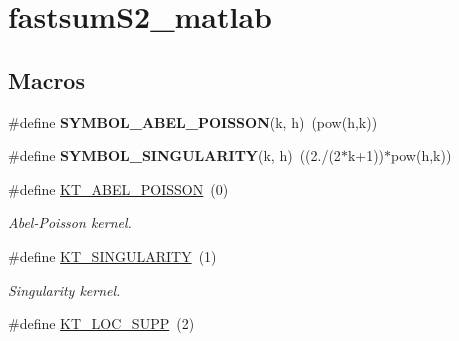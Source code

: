 \hypertarget{group__applications__fastsumS2__test}{\section{fastsum\-S2\-\_\-matlab}
\label{group__applications__fastsumS2__test}
}
\subsection*{Macros}
\begin{DoxyCompactItemize}
\item 
\hypertarget{group__applications__fastsumS2__test_ga0512f12a35b9bcac68ac0d36cd9b50d5}{\#define {\bfseries S\-Y\-M\-B\-O\-L\-\_\-\-A\-B\-E\-L\-\_\-\-P\-O\-I\-S\-S\-O\-N}(k, h)~(pow(h,k))}\label{group__applications__fastsumS2__test_ga0512f12a35b9bcac68ac0d36cd9b50d5}

\item 
\hypertarget{group__applications__fastsumS2__test_ga580e1a9e3fba99e0750908b58010dc00}{\#define {\bfseries S\-Y\-M\-B\-O\-L\-\_\-\-S\-I\-N\-G\-U\-L\-A\-R\-I\-T\-Y}(k, h)~((2./(2$\ast$k+1))$\ast$pow(h,k))}\label{group__applications__fastsumS2__test_ga580e1a9e3fba99e0750908b58010dc00}

\item 
\hypertarget{group__applications__fastsumS2__test_ga0452118afd292fc346ed8116915d001e}{\#define \hyperlink{group__applications__fastsumS2__test_ga0452118afd292fc346ed8116915d001e}{K\-T\-\_\-\-A\-B\-E\-L\-\_\-\-P\-O\-I\-S\-S\-O\-N}~(0)}\label{group__applications__fastsumS2__test_ga0452118afd292fc346ed8116915d001e}

\begin{DoxyCompactList}\small\item\em Abel-\/\-Poisson kernel. \end{DoxyCompactList}\item 
\hypertarget{group__applications__fastsumS2__test_ga814ba1b58f017f7a67a85f68d4719814}{\#define \hyperlink{group__applications__fastsumS2__test_ga814ba1b58f017f7a67a85f68d4719814}{K\-T\-\_\-\-S\-I\-N\-G\-U\-L\-A\-R\-I\-T\-Y}~(1)}\label{group__applications__fastsumS2__test_ga814ba1b58f017f7a67a85f68d4719814}

\begin{DoxyCompactList}\small\item\em Singularity kernel. \end{DoxyCompactList}\item 
\hypertarget{group__applications__fastsumS2__test_gae2a54d1d59448d9f02697f89a6ec7306}{\#define \hyperlink{group__applications__fastsumS2__test_gae2a54d1d59448d9f02697f89a6ec7306}{K\-T\-\_\-\-L\-O\-C\-\_\-\-S\-U\-P\-P}~(2)}\label{group__applications__fastsumS2__test_gae2a54d1d59448d9f02697f89a6ec7306}


\end{DoxyCompactItemize}
